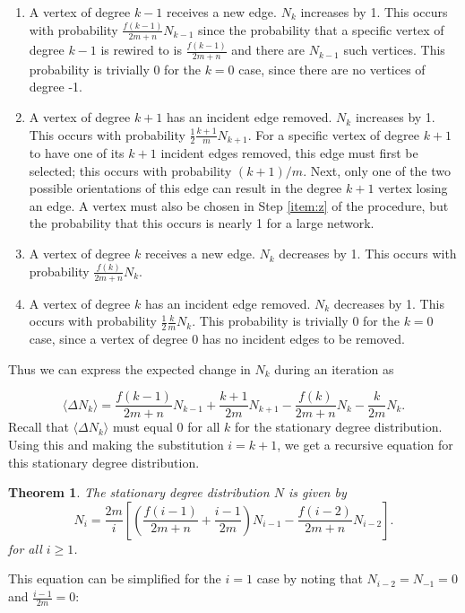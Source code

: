 \documentclass[a4paper,10pt]{article}
\newtheorem{theorem}{Theorem}
\begin{document}
\begin{enumerate}
 \item A vertex of degree $k - 1$ receives a new edge. $N_k$ increases by 1. This occurs with probability $\frac{f(k - 1)}{2m + n} N_{k-1}$ since the probability that a specific vertex of degree $k - 1$ is rewired to is $\frac{f(k - 1)}{2m + n}$ and there are $N_{k - 1}$ such vertices. This probability is trivially 0 for the $k = 0$ case, since there are no vertices of degree -1.
 
 \item A vertex of degree $k + 1$ has an incident edge removed. $N_k$ increases by 1. This occurs with probability $\frac{1}{2} \frac{k + 1}{m} N_{k + 1}$. For a specific vertex of degree $k + 1$ to have one of its $k + 1$ incident edges removed, this edge must first be selected; this occurs with probability $(k + 1)/ m$. Next, only one of the two possible orientations of this edge can result in the degree $k + 1$ vertex losing an edge. A vertex must also be chosen in Step \ref{item:z} of the procedure, but the probability that this occurs is nearly 1 for a large network.
 
 \item A vertex of degree $k$ receives a new edge. $N_k$ decreases by 1. This occurs with probability $\frac{f(k)}{2m + n} N_k$.
 
 \item A vertex of degree $k$ has an incident edge removed. $N_k$ decreases by 1. This occurs with probability $\frac{1}{2} \frac{k}{m} N_{k}.$ This probability is trivially 0 for the $k = 0$ case, since a vertex of degree 0 has no incident edges to be removed.
\end{enumerate}
Thus we can express the expected change in $N_k$ during an iteration as

\begin{equation}
\label{eqn:N_k}
 \langle \Delta N_k \rangle = \frac{f(k - 1)}{2m + n} N_{k-1} + \frac{k + 1}{2m} N_{k + 1} - \frac{f(k)}{2m + n} N_{k} - \frac{k}{2m} N_{k}.
\end{equation}
Recall that $\langle \Delta N_k \rangle$ must equal 0 for all $k$ for the stationary degree distribution. Using this and making the substitution $i = k + 1$, we get a recursive equation for this stationary degree distribution.

\begin{theorem}
The stationary degree distribution $N$ is given by 
\begin{equation}
\label{eqn:N_i}
 N_{i} = \frac{2m}{i}\left[\left( \frac{f(i - 1)}{2m + n} + \frac{i - 1}{2m} \right) N_{i - 1} -  \frac{f(i - 2)}{2m + n} N_{i - 2}\right].
\end{equation}
for all $i \geq 1$.
\end{theorem}
This equation can be simplified for the $i = 1$ case by noting that $N_{i - 2} = N_{-1} = 0$ and $\frac{i - 1}{2m} = 0$:
\end{document}
